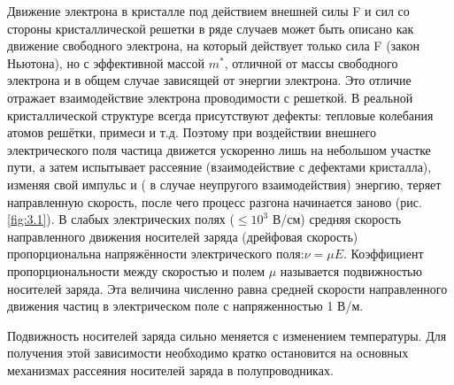 		Движение электрона в кристалле под действием внешней силы F и сил со стороны кристаллической решетки в ряде случаев
		может быть описано как движение свободного электрона, на который действует только сила F (закон Ньютона), но с
		эффективной массой $m^*$, отличной от массы свободного электрона и в общем случае зависящей от энергии электрона. Это
		отличие отражает взаимодействие электрона проводимости с решеткой. 
		В реальной кристаллической структуре всегда присутствуют дефекты: тепловые колебания атомов решётки, примеси и т.д.
		Поэтому при воздействии внешнего электрического поля частица движется ускоренно лишь на небольшом участке пути, а затем
		испытывает рассеяние (взаимодействие с дефектами кристалла), изменяя свой импульс и ( в случае неупругого
		взаимодействия) энергию, теряет направленную скорость, после чего процесс разгона начинается заново (рис. \ref{fig:3.1}). В слабых
		электрических полях ($\leq 10^3$ В/см) средняя скорость направленного движения носителей заряда (дрейфовая скорость)
		пропорциональна напряжённости электрического поля:$\nu = \mu E$. Коэффициент пропорциональности между скоростью и полем $\mu$
		называется подвижностью носителей заряда. Эта величина численно равна средней скорости направленного движения частиц в
		электрическом поле с напряженностью 1 В/м. 
		
		Подвижность носителей заряда сильно меняется с изменением температуры. Для получения этой зависимости необходимо кратко
		остановится на основных механизмах рассеяния носителей заряда в полупроводниках. 
		
